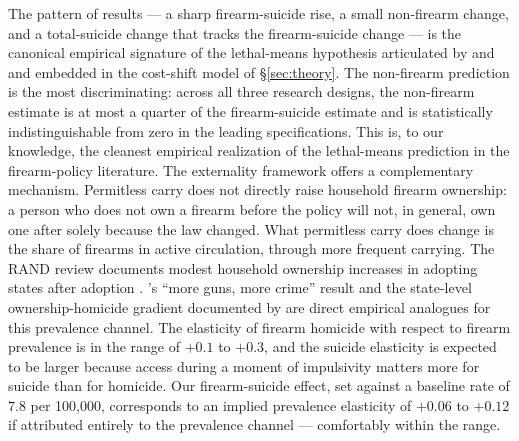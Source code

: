 \documentclass[12pt]{article}
\newcommand{\citepg}[2]{\citep[][p.~#2]{#1}}  %
\begin{document}
The pattern of results --- a sharp firearm-suicide rise, a small
non-firearm change, and a total-suicide change that tracks the
firearm-suicide change --- is the canonical empirical signature of
the lethal-means hypothesis articulated by \citet{millerhemenway1999}
and \citet{miller2002a} and embedded in the cost-shift model of
§\ref{sec:theory}. The non-firearm prediction is the most
discriminating: across all three research designs, the non-firearm
estimate is at most a quarter of the firearm-suicide estimate and
is statistically indistinguishable from zero in the leading
specifications. This is, to our knowledge, the cleanest empirical
realization of the lethal-means prediction in the firearm-policy
literature. The \citet{cookludwig2006} externality framework offers
a complementary mechanism. Permitless carry does not directly raise
household firearm ownership: a person who does not own a firearm
before the policy will not, in general, own one after solely
because the law changed. What permitless carry does change is the
share of firearms in active circulation, through more frequent
carrying. The RAND review documents modest household ownership
increases in adopting states after adoption \citepg{rand2024}{42}.
\citet{duggan2001}'s ``more guns, more crime'' result and the
state-level ownership-homicide gradient documented by
\citet{millerhemenwayazrael2007} are direct empirical analogues for
this prevalence channel. The \citeauthor{cookludwig2006} elasticity
of firearm homicide with respect to firearm prevalence is in the
range of $+0.1$ to $+0.3$, and the suicide elasticity is expected
to be larger because access during a moment of impulsivity matters
more for suicide than for homicide. Our firearm-suicide effect,
set against a baseline rate of $7.8$ per 100,000, corresponds to an
implied prevalence elasticity of $+0.06$ to $+0.12$ if attributed
entirely to the prevalence channel --- comfortably within the
\citeauthor{cookludwig2006} range.
\end{document}
